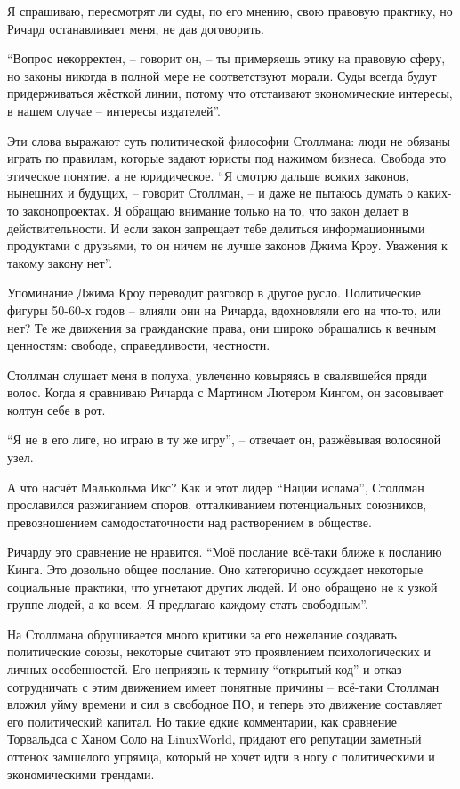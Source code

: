 Я спрашиваю, пересмотрят ли суды, по его мнению, свою правовую практику, но Ричард останавливает меня, не дав договорить.

\enquote{Вопрос некорректен, -- говорит он, -- ты примеряешь этику на правовую сферу, но законы никогда в полной мере не соответствуют морали. Суды всегда будут придерживаться жёсткой линии, потому что отстаивают экономические интересы, в нашем случае -- интересы издателей}.

Эти слова выражают суть политической философии Столлмана: люди не обязаны играть по правилам, которые задают юристы под нажимом бизнеса. Свобода это этическое понятие, а не юридическое. \enquote{Я смотрю дальше всяких законов, нынешних и будущих, -- говорит Столлман, -- и даже не пытаюсь думать о каких-то законопроектах. Я обращаю внимание только на то, что закон делает в действительности. И если закон запрещает тебе делиться информационными продуктами с друзьями, то он ничем не лучше законов Джима Кроу. Уважения к такому закону нет}.

Упоминание Джима Кроу переводит разговор в другое русло. Политические фигуры 50-60-х годов -- влияли они на Ричарда, вдохновляли его на что-то, или нет? Те же движения за гражданские права, они широко обращались к вечным ценностям: свободе, справедливости, честности.

Столлман слушает меня в полуха, увлеченно ковыряясь в свалявшейся пряди волос. Когда я сравниваю Ричарда с Мартином Лютером Кингом, он засовывает колтун себе в рот.

\enquote{Я не в его лиге, но играю в ту же игру}, -- отвечает он, разжёвывая волосяной узел.

А что насчёт Малькольма Икс? Как и этот лидер \enquote{Нации ислама}, Столлман прославился разжиганием споров, отталкиванием потенциальных союзников, превозношением самодостаточности над растворением в обществе.

Ричарду это сравнение не нравится. \enquote{Моё послание всё-таки ближе к посланию Кинга. Это довольно общее послание. Оно категорично осуждает некоторые социальные практики, что угнетают других людей. И оно обращено не к узкой группе людей, а ко всем. Я предлагаю каждому стать свободным}.

На Столлмана обрушивается много критики за его нежелание создавать политические союзы, некоторые считают это проявлением психологических и личных особенностей. Его неприязнь к термину \enquote{открытый код} и отказ сотрудничать с этим движением имеет понятные причины -- всё-таки Столлман вложил уйму времени и сил в свободное ПО, и теперь это движение составляет его политический капитал. Но такие едкие комментарии, как сравнение Торвальдса с Ханом Соло на LinuxWorld, придают его репутации заметный оттенок замшелого упрямца, который не хочет идти в ногу с политическими и экономическими трендами.

